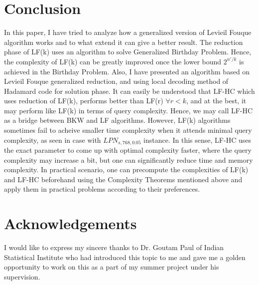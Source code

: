 \documentclass{article}
\begin{document}
 \section{Conclusion}
 In this paper, I have tried to analyze how a generalized version of Levieil Fouque algorithm works and to what extend it can give a better result. The reduction phase of LF(k) uses an algorithm to solve Generalized Birthday Problem. Hence, the complexity of LF(k) can be greatly improved once the lower bound $2^{n'/k}$ is achieved in the Birthday Problem. Also, I have presented an algorithm based on Levieil Fouque generalized reduction, and using local decoding method of Hadamard code for solution phase. It can easily be understood that LF-HC which uses reduction of LF(k), performs better than LF(r) $\forall r<k$, and at the best, it may perform like LF(k) in terms of query complexity. Hence, we may call LF-HC as a bridge between BKW and LF algorithms. However, LF(k) algorithms sometimes fail to acheive smaller time complexity when it attends minimal query complexity, as seen in case with $LPN_{s,768,0.05}$ instance. In this sense, LF-HC uses the exact parameter to come up with optimal complexity faster, where the query complexity may increase a bit, but one can significantly reduce time and memory complexity. In practical scenario, one can precompute the complexities of LF(k) and LF-HC beforehand using the Complexity Theorems mentioned above and apply them in practical problems according to their preferences. 
 
 \section{Acknowledgements}
 I would like to express my sincere thanks to Dr. Goutam Paul of Indian Statistical Institute who had introduced this topic to me and gave me a golden opportunity to work on this as a part of my summer project under his supervision. 
 
\end{document}
